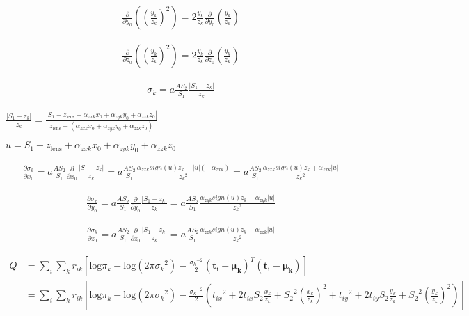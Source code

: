 \begin{align}
\frac{\partial}{\partial y_0}\left(\left(\frac{y_k}{z_k}\right)^2\right) = 2 \frac{y_k}{z_k} \frac{\partial}{\partial y_0}\left(\frac{y_k}{z_k}\right)
\end{align}

\begin{align}
\frac{\partial}{\partial z_0}\left(\left(\frac{y_k}{z_k}\right)^2\right) = 2 \frac{y_k}{z_k} \frac{\partial}{\partial z_0}\left(\frac{y_k}{z_k}\right)
\end{align}





\begin{align}
\sigma_k = a \frac{AS_2}{S_1} \frac{|S_1-z_k|}{z_k}
\end{align}

$ \frac{|S_1-z_k|}{z_k} = \frac{|S_1 - z_\text{lens} + \alpha_{zxk}x_0 + \alpha_{zyk}y_0 + \alpha_{zzk}z_0|}{z_\text{lens} - (\alpha_{zxk}x_0 + \alpha_{zyk}y_0 + \alpha_{zzk}z_0)} $

$ u = S_1 - z_\text{lens} + \alpha_{zxk}x_0 + \alpha_{zyk}y_0 + \alpha_{zzk}z_0 $


\begin{align}
\frac{\partial \sigma_k}{\partial x_0} = a\frac{AS_2}{S_1} \frac{\partial}{\partial x_0} \frac{|S_1-z_k|}{z_k} =  a\frac{AS_2}{S_1} \frac{\alpha_{zxk}sign(u)z_k - |u|(-\alpha_{zxk})}{{z_k}^2} =  a\frac{AS_2}{S_1} \frac{\alpha_{zxk}sign(u)z_k + \alpha_{zxk}|u|}{{z_k}^2}
\end{align}

\begin{align}
\frac{\partial \sigma_k}{\partial y_0} = a\frac{AS_2}{S_1} \frac{\partial}{\partial y_0} \frac{|S_1-z_k|}{z_k} =  a\frac{AS_2}{S_1} \frac{\alpha_{zyk}sign(u)z_k + \alpha_{zyk}|u|}{{z_k}^2}
\end{align}

\begin{align}
\frac{\partial \sigma_k}{\partial z_0} =  a\frac{AS_2}{S_1} \frac{\partial}{\partial z_0} \frac{|S_1-z_k|}{z_k} =   a\frac{AS_2}{S_1} \frac{\alpha_{zzk}sign(u)z_k + \alpha_{zzk}|u|}{{z_k}^2}
\end{align}


\begin{align} \label{eqn:Q_no_weight}
Q &= \sum_i \sum_k r_{ik} \left[ \text{log}\pi_k - \text{log}(2\pi{\sigma_k}^2) - \frac{{\sigma_k}^{-2}}{2}(\bm{t_i}-\bm{\mu_k})^T(\bm{t_i}-\bm{\mu_k}) \right] \\
&= \sum_i \sum_k r_{ik} \left[ \text{log}\pi_k - \text{log}(2\pi{\sigma_k}^2) - \frac{{\sigma_k}^{-2}}{2} \left({t_{ix}}^2 + 2t_{ix}S_2\frac{x_k}{z_k} + {S_2}^2\left(\frac{x_k}{z_k}\right)^2 + {t_{iy}}^2 + 2t_{iy}S_2\frac{y_k}{z_k} + {S_2}^2\left(\frac{y_k}{z_k}\right)^2 \right) \right]
\end{align}

